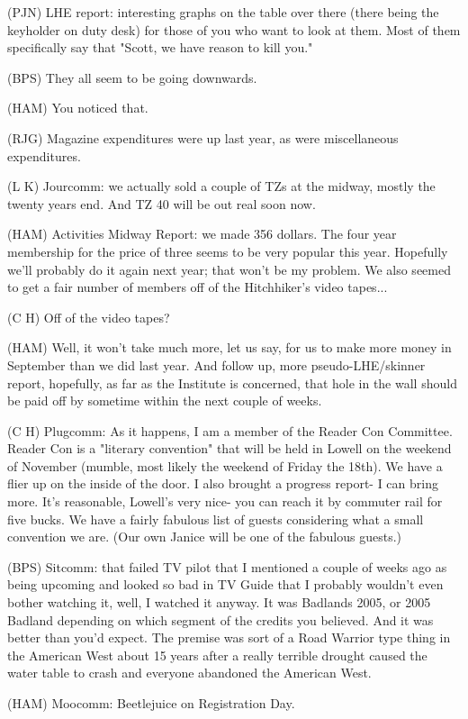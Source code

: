 \documentclass[12pt]{article}
\begin{document}
(PJN) LHE report: interesting graphs on the table over there (there being the keyholder on duty desk) for those of you who want to look at them. Most of them specifically say that "Scott, we have reason to kill you."

(BPS) They all seem to be going downwards.

(HAM) You noticed that.

(RJG) Magazine expenditures were up last year, as were miscellaneous expenditures.

(L K) Jourcomm: we actually sold a couple of TZs at the midway, mostly the twenty years end. And TZ 40 will be out real soon now.

(HAM) Activities Midway Report: we made 356 dollars. The four year membership for the price of three seems to be very popular this year. Hopefully we'll probably do it again next year; that won't be my problem. We also seemed to get a fair number of members off of the Hitchhiker's video tapes...

(C H) Off of the video tapes?

(HAM) Well, it won't take much more, let us say, for us to make more money in September than we did last year. And follow up, more pseudo-LHE/skinner report, hopefully, as far as the Institute is concerned, that hole in the wall should be paid off by sometime within the next couple of weeks.

(C H) Plugcomm: As it happens, I am a member of the Reader Con Committee. Reader Con is a "literary convention" that will be held in Lowell on the weekend of November (mumble, most likely the weekend of Friday the 18th). We have a flier up on the inside of the door. I also brought a progress report- I can bring more. It's reasonable, Lowell's very nice- you can reach it by commuter rail for five bucks. We have a fairly fabulous list of guests considering what a small convention we are. (Our own Janice will be one of the fabulous guests.)

(BPS) Sitcomm: that failed TV pilot that I mentioned a couple of weeks ago as being upcoming and looked so bad in TV Guide that I probably wouldn't even bother watching it, well, I watched it anyway. It was Badlands 2005, or 2005 Badland depending on which segment of the credits you believed. And it was better than you'd expect. The premise was sort of a Road Warrior type thing in the American West about 15 years after a really terrible drought caused the water table to crash and everyone abandoned the American West.

(HAM) Moocomm: Beetlejuice on Registration Day.
\end{document}

